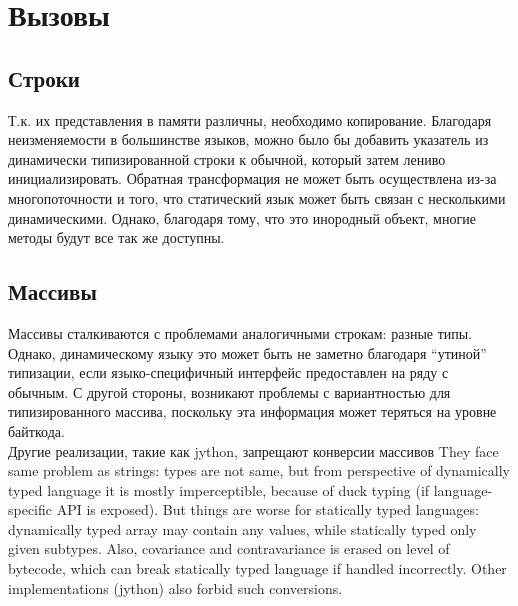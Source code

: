 \documentclass[times,specification,annotation]{itmo-student-thesis}
\begin{document}
\section{Вызовы}
\subsection{Строки}
Т.к. их представления в памяти различны, необходимо копирование. Благодаря неизменяемости в большинстве языков, можно было бы добавить указатель из динамически типизированной строки к обычной, который затем лениво инициализировать. Обратная трансформация не может быть осуществлена из-за многопоточности и того, что статический язык может быть связан с несколькими динамическими. Однако, благодаря тому, что это инородный объект, многие методы будут все так же доступны.

\subsection{Массивы}
Массивы сталкиваются с проблемами аналогичными строкам: разные типы. Однако, динамическому языку это может быть не заметно благодаря ``утиной'' типизации, если языко-специфичный интерфейс предоставлен на ряду с обычным. С другой стороны, возникают проблемы с вариантностью для типизированного массива, поскольку эта информация может теряться на уровне байткода.\\
Другие реализации, такие как jython, запрещают конверсии массивов
They face same problem as strings: types are not same, but from perspective of dynamically typed language it is mostly imperceptible, because of duck typing (if language-specific API is exposed). But things are worse for statically typed languages: dynamically typed array may contain any values, while statically typed only given subtypes. Also, covariance and contravariance is erased on level of bytecode, which can break statically typed language if handled incorrectly. Other implementations (jython) also forbid such conversions.
\end{document}
